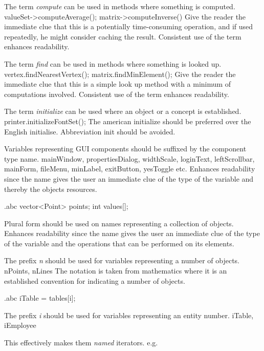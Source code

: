 \recommendation
{The term \textit{compute} can be used in methods where something is computed.}
{
	valueSet-\textgreater computeAverage();\newline
	matrix-\textgreater computeInverse()
}
{Give the reader the immediate clue that this is a potentially time-consuming operation, and if used repeatedly, he might consider caching the result. Consistent use of the term enhances readability.}

\recommendation
{The term \textit{find} can be used in methods where something is looked up.}
{
	vertex.findNearestVertex(); \newline
	matrix.findMinElement();
}
{Give the reader the immediate clue that this is a simple look up method with a minimum of computations involved. Consistent use of the term enhances readability.}

\recommendation
{The term \textit{initialize} can be used where an object or a concept is established.}
{printer.initializeFontSet();}
{The american initialize should be preferred over the English initialise. Abbreviation init should be avoided.}

\recommendation
{Variables representing GUI components should be suffixed by the component type name.}
{mainWindow, propertiesDialog, widthScale, loginText, leftScrollbar, mainForm, fileMenu, minLabel, exitButton, yesToggle etc.}
{Enhances readability since the name gives the user an immediate clue of the type of the variable and thereby the objects resources.}

\begin{filecontents*}{\jobname.abc}
	vector<Point>  points;
	int            values[];
\end{filecontents*}

\recommendation
{Plural form should be used on names representing a collection of objects.}
{}
{Enhances readability since the name gives the user an immediate clue of the type of the variable and the operations that can be performed on its elements.}

\recommendation
{The prefix \textit{n} should be used for variables representing a number of objects.}
{nPoints, nLines}
{The notation is taken from mathematics where it is an established convention for indicating a number of objects.}

\begin{filecontents*}{\jobname.abc}
	iTable = tables[i];
\end{filecontents*}

\recommendation
{The prefix \textit{i} should be used for variables representing an entity number.}
{iTable, iEmployee }
{
	This effectively makes them \textit{named} iterators.\newline
	e.g.
	
}

